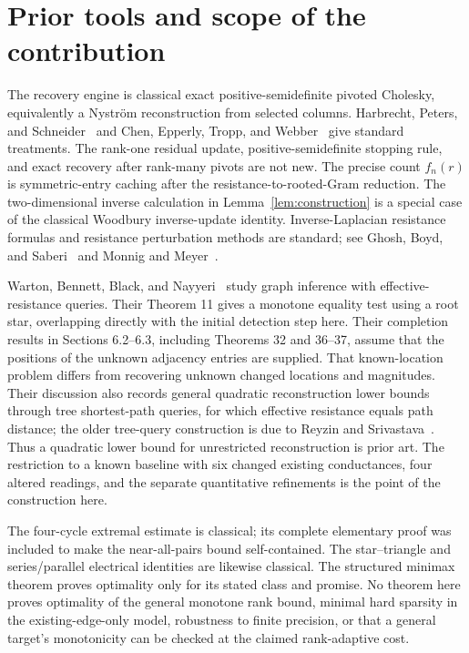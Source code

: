 \documentclass[11pt,letterpaper]{article}
\begin{document}
\section{Prior tools and scope of the contribution}
The recovery engine is classical exact positive-semidefinite pivoted Cholesky, equivalently a Nystr\"om reconstruction from selected columns. Harbrecht, Peters, and Schneider~\cite{HPS} and Chen, Epperly, Tropp, and Webber~\cite{CETW} give standard treatments. The rank-one residual update, positive-semidefinite stopping rule, and exact recovery after rank-many pivots are not new. The precise count $f_n(r)$ is symmetric-entry caching after the resistance-to-rooted-Gram reduction. The two-dimensional inverse calculation in Lemma~\ref{lem:construction} is a special case of the classical Woodbury inverse-update identity. Inverse-Laplacian resistance formulas and resistance perturbation methods are standard; see Ghosh, Boyd, and Saberi~\cite{GBS} and Monnig and Meyer~\cite{MM}.

Warton, Bennett, Black, and Nayyeri~\cite{WBBN} study graph inference with effective-resistance queries. Their Theorem 11 gives a monotone equality test using a root star, overlapping directly with the initial detection step here. Their completion results in Sections 6.2--6.3, including Theorems 32 and 36--37, assume that the positions of the unknown adjacency entries are supplied. That known-location problem differs from recovering unknown changed locations and magnitudes. Their discussion also records general quadratic reconstruction lower bounds through tree shortest-path queries, for which effective resistance equals path distance; the older tree-query construction is due to Reyzin and Srivastava~\cite{RS}. Thus a quadratic lower bound for unrestricted reconstruction is prior art. The restriction to a known baseline with six changed existing conductances, four altered readings, and the separate quantitative refinements is the point of the construction here.

The four-cycle extremal estimate is classical; its complete elementary proof was included to make the near-all-pairs bound self-contained. The star--triangle and series/parallel electrical identities are likewise classical. The structured minimax theorem proves optimality only for its stated class and promise. No theorem here proves optimality of the general monotone rank bound, minimal hard sparsity in the existing-edge-only model, robustness to finite precision, or that a general target's monotonicity can be checked at the claimed rank-adaptive cost.
\end{document}
